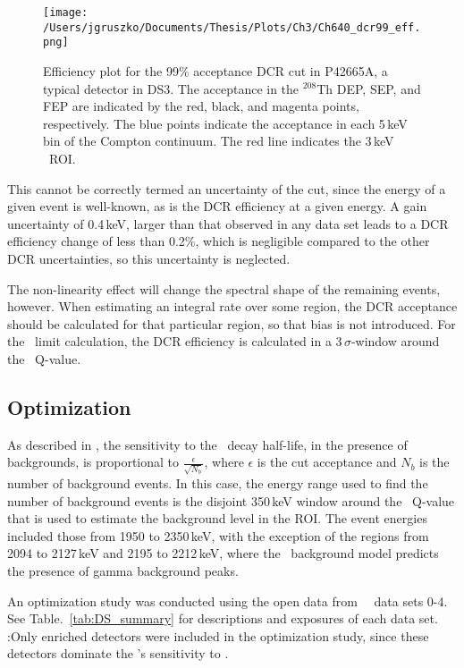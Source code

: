 \begin{figure}[t]
 \centering
 \texttt{[image: /Users/jgruszko/Documents/Thesis/Plots/Ch3/Ch640\_dcr99\_eff.png]}
 \caption[99\% acceptance DCR cut efficiency and uncertainties]{Efficiency plot for the 99\% acceptance DCR cut in P42665A, a typical detector in DS3. The acceptance in the $^{208}$Th DEP, SEP, and FEP are indicated by the red, black, and magenta points, respectively. The blue points indicate the acceptance in each 5\,keV bin of the Compton continuum. The red line indicates the 3\,keV \nonubb\ ROI.} 
 \label{fig:dcr99_eff}
\end{figure}

This cannot be correctly termed an uncertainty of the cut, since the energy of a given event is well-known, as is the DCR efficiency at a given energy. A gain uncertainty of 0.4\,keV, larger than that observed in any data set \cite{EnergyUnidoc} leads to a DCR efficiency change of less than 0.2\%, which is negligible compared to the other DCR uncertainties, so this uncertainty is neglected. 

The non-linearity effect will change the spectral shape of the remaining events, however. When estimating an integral rate over some region, the DCR acceptance should be calculated for that particular region, so that bias is not introduced. For the \nonubb\ limit calculation, the DCR efficiency is calculated in a 3\,$\sigma$-window around the \nonubb\ Q-value. 

\subsection{Optimization}
As described in \cite{Detwiler_sensitivity}, the sensitivity to the \nonubb\ decay half-life, in the presence of backgrounds, is proportional to $\frac{\epsilon}{\sqrt{N_b}}$, where $\epsilon$ is the cut acceptance and $N_b$ is the number of background events. In this case, the energy range used to find the number of background events is the disjoint 350\,keV window around the \nonubb\ Q-value that is used to estimate the background level in the ROI. The event energies included those from 1950 to 2350\,keV, with the exception of the regions from 2094 to 2127\,keV and 2195 to 2212\,keV, where the \MJ\ background model predicts the presence of gamma background peaks. 

An optimization study was conducted using the open data from \MJ\ \DEM\ data sets 0-4. See Table.~\ref{tab:DS_summary} for descriptions and exposures of each data set.  :Only enriched detectors were included in the optimization study, since these detectors dominate the \DEM 's sensitivity to \nonubb . 

